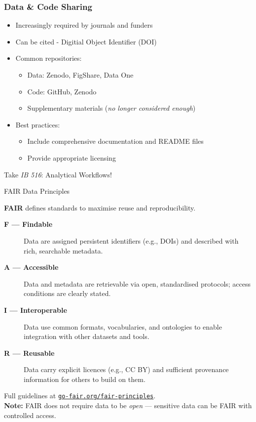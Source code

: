 \documentclass{beamer}
\begin{document}
\begin{frame}
  \frametitle{Data \& Code Sharing}
  \begin{itemize}
    \item Increasingly required by journals and funders
    \item Can be cited - Digitial Object Identifier  (DOI)
    \item Common repositories:
    \begin{itemize}
      \item Data: Zenodo, FigShare, Data One
      \item Code: GitHub, Zenodo
      \item Supplementary materials (\textit{no longer considered enough})
    \end{itemize}
    \item Best practices:
    \begin{itemize}
      \item Include comprehensive documentation and README files
      \item Provide appropriate licensing
    \end{itemize}
  \end{itemize}

  \bigskip

  \begin{center}
  \alert{Take \textit{IB 516}: Analytical Workflows!}
  \end{center}

\end{frame}


\begin{frame}{FAIR Data Principles}

  \textbf{FAIR} defines standards to maximise reuse and reproducibility.
  \medskip
  {\footnotesize
  \begin{description}
    \item[\textbf{F --- Findable}] Data are assigned persistent identifiers (e.g., DOIs)
      and described with rich, searchable metadata.
    \item[\textbf{A --- Accessible}] Data and metadata are retrievable via open, standardised
      protocols; access conditions are clearly stated.
    \item[\textbf{I --- Interoperable}] Data use common formats, vocabularies, and ontologies
      to enable integration with other datasets and tools.
    \item[\textbf{R --- Reusable}] Data carry explicit licences (e.g., CC BY) and sufficient
      provenance information for others to build on them.
  \end{description}
  }

  \medskip
  \small
  Full guidelines at \href{https://www.go-fair.org/fair-principles}{\texttt{go-fair.org/fair-principles}}.\\
  \smallskip
  \textbf{Note:} FAIR does not require data to be \emph{open} --- sensitive data can be
  FAIR with controlled access.

\end{frame}
\end{document}
